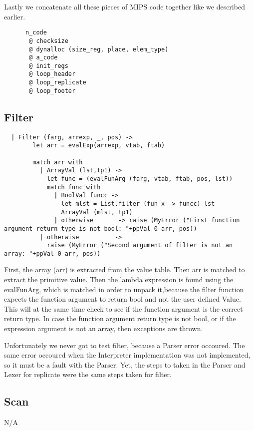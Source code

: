 Lastly we concatenate all these pieces of MIPS code together like we described earlier.
\begin{verbatim}
      n_code
       @ checksize
       @ dynalloc (size_reg, place, elem_type)
       @ a_code
       @ init_regs
       @ loop_header
       @ loop_replicate
       @ loop_footer
\end{verbatim}


\subsection*{Filter}
\begin{verbatim}
  | Filter (farg, arrexp, _, pos) ->
        let arr = evalExp(arrexp, vtab, ftab)
        
        match arr with
          | ArrayVal (lst,tp1) ->
            let func = (evalFunArg (farg, vtab, ftab, pos, lst))
            match func with
              | BoolVal funcc ->
                let mlst = List.filter (fun x -> funcc) lst
                ArrayVal (mlst, tp1)
              | otherwise       -> raise (MyError ("First function argument return type is not bool: "+ppVal 0 arr, pos))
          | otherwise          -> 
            raise (MyError ("Second argument of filter is not an array: "+ppVal 0 arr, pos))
\end{verbatim}

First, the array (arr) is extracted from the value table. Then arr is matched to extract the primitive value. Then the lambda expression is found using the evalFunArg, which is matched in order to unpack it,because the filter function expects the function argument to return bool and not the user defined Value. This will at the same time check to see if the function argument is the correct return type. In case the function argument return type is not bool, or if the expression argument is not an array, then exceptions are thrown.

Unfortunately we never got to test filter, because a Parser error occoured. The same error occoured when the Interpreter implementation was not implemented, so it must be a fault with the Parser. Yet, the steps to taken in the Parser and Lexer for replicate were the same steps taken for filter. 

\subsection*{Scan}
N/A

